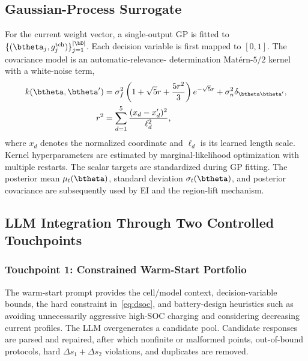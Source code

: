 \subsection{Gaussian-Process Surrogate}

For the current weight vector, a single-output GP is fitted to
$\{(\btheta_j,g_j^{\mathrm{tch}})\}_{j=1}^{|\bD|}$. Each decision variable is
first mapped to $[0,1]$. The covariance model is an automatic-relevance-
determination Mat\'{e}rn-$5/2$ kernel with a white-noise term,
\begin{align}
k(\btheta,\btheta')
&=\sigma_f^2
\left(1+\sqrt{5}r+\frac{5r^2}{3}\right)e^{-\sqrt{5}r}
+\sigma_n^2\delta_{\btheta\btheta'},
\label{eq:matern}\\
r^2
&=\sum_{d=1}^{5}
\frac{(x_d-x_d')^2}{\ell_d^2},
\nonumber
\end{align}
where $x_d$ denotes the normalized coordinate and $\ell_d$ is its learned
length scale. Kernel hyperparameters are estimated by marginal-likelihood
optimization with multiple restarts. The scalar targets are standardized during
GP fitting. The posterior mean $\mu_t(\btheta)$, standard deviation
$\sigma_t(\btheta)$, and posterior covariance are subsequently used by EI and
the region-lift mechanism.

\subsection{LLM Integration Through Two Controlled Touchpoints}

\subsubsection{Touchpoint 1: Constrained Warm-Start Portfolio}

The warm-start prompt provides the cell/model context, decision-variable
bounds, the hard constraint in~\eqref{eq:dsoc}, and battery-design heuristics
such as avoiding unnecessarily aggressive high-SOC charging and considering
decreasing current profiles. The LLM overgenerates a candidate pool. Candidate
responses are parsed and repaired, after which nonfinite or malformed points,
out-of-bound protocols, hard $\Delta s_1+\Delta s_2$ violations, and duplicates
are removed.

